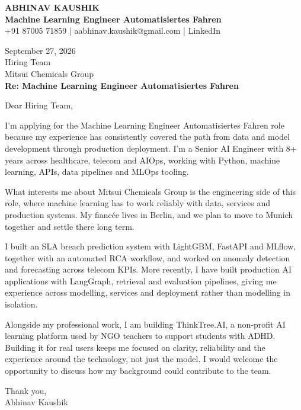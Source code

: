 \documentclass[10pt,a4paper]{article}
\begin{document}
\begin{center}
{\Large\bfseries ABHINAV KAUSHIK}\\[2pt]
{\bfseries Machine Learning Engineer Automatisiertes Fahren}\\[2pt]
+91 87005 71859 \quad | \quad aabhinav.kaushik@gmail.com \quad | \quad LinkedIn
\end{center}
\vspace{8pt}
September 27, 2026\\[6pt]
Hiring Team\\
Mitsui Chemicals Group\\[4pt]
\textbf{Re: Machine Learning Engineer Automatisiertes Fahren}

Dear Hiring Team,

I’m applying for the Machine Learning Engineer Automatisiertes Fahren role because my experience has consistently covered the path from data and model development through production deployment. I’m a Senior AI Engineer with 8+ years across healthcare, telecom and AIOps, working with Python, machine learning, APIs, data pipelines and MLOps tooling.

What interests me about Mitsui Chemicals Group is the engineering side of this role, where machine learning has to work reliably with data, services and production systems. My fiancée lives in Berlin, and we plan to move to Munich together and settle there long term.

I built an SLA breach prediction system with LightGBM, FastAPI and MLflow, together with an automated RCA workflow, and worked on anomaly detection and forecasting across telecom KPIs. More recently, I have built production AI applications with LangGraph, retrieval and evaluation pipelines, giving me experience across modelling, services and deployment rather than modelling in isolation.

Alongside my professional work, I am building ThinkTree.AI, a non-profit AI learning platform used by NGO teachers to support students with ADHD. Building it for real users keeps me focused on clarity, reliability and the experience around the technology, not just the model. I would welcome the opportunity to discuss how my background could contribute to the team.

Thank you,\\
Abhinav Kaushik
\end{document}
